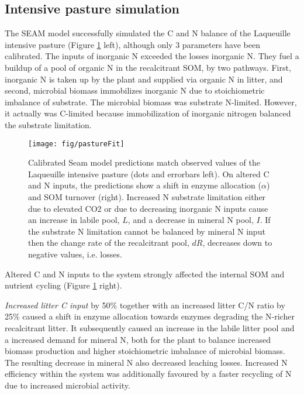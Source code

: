 \subsection{Intensive pasture simulation}

The SEAM model successfully simulated the C and N balance of the Laqueuille
intensive pasture (Figure \ref{fig:pastureFit} left), although only 3 parameters
have been calibrated.
The inputs of inorganic N exceeded the losses inorganic N. They fuel a buildup
of a pool of organic N in the recalcitrant SOM, by two pathways. First,
inorganic N is taken up by the plant and supplied via organic N in litter, and
second, microbial biomass immobilizes inorganic N due to stoichiometric
imbalance of substrate. The microbial biomass was substrate N-limited. However,
it actually was C-limited because immobilization of inorganic nitrogen balanced
the substrate limitation. 

\begin{figure}[t] \vspace*{2mm}
\label{fig:pastureFit}
\begin{center}
\texttt{[image: fig/pastureFit]} 
\end{center}
\caption{Calibrated Seam model predictions match observed values of the
Laqueuille intensive pasture (dots and errorbars left). On altered C and N
inputs, the predictions show a shift in enzyme allocation ($\alpha$) and SOM
turnover (right).
Increased N substrate limitation either due to elevated CO2 or due to
decreasing inorganic N inputs cause an increase in labile pool, $L$, and a
decrease in mineral N pool, $I$. If the substrate N limitation cannot be balanced by mineral N
input then the change rate of the recalcitrant pool, $dR$, decreases down to
negative values, i.e. losses.
}
\end{figure}   

Altered C and N inputs to the system strongly affected the internal SOM and
nutrient cycling (Figure \ref{fig:pastureFit} right). 

\textit{Increased litter C input} by 50\% together with an increased litter
C/N ratio by 25\% caused a shift in enzyme allocation towards enzymes degrading the
N-richer recalcitrant litter. It subsequently caused an increase in the
labile litter pool and a increased demand for mineral N, both for 
the plant to balance increased biomass production and higher stoichiometric
imbalance of microbial biomass. The resulting decrease in mineral N also
decreased leaching losses. Increased N efficiency within the system was
additionally favoured by a faster recycling of N due to increased
microbial activity. 

